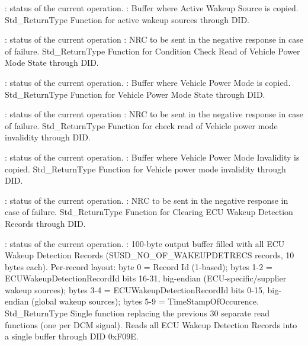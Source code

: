 {
{: status of the current operation.}
{: Buffer where Active Wakeup Source is copied.}
{}
{Std_ReturnType}
{Function for active wakeup sources through DID.}
}
{}

{
{: status of the current operation}
{: NRC to be sent in the negative response in case of failure.}
{}
{Std_ReturnType}
{Function for Condition Check Read of Vehicle Power Mode State through DID.}
}
{}

{
{: status of the current operation.}
{: Buffer where Vehicle Power Mode is copied.}
{}
{Std_ReturnType}
{Function for Vehicle Power Mode State through DID.}
}
{}

{
{: status of the current operation}
{: NRC to be sent in the negative response in case of failure.}
{}
{Std_ReturnType}
{Function for check read of Vehicle power mode invalidity through DID.}
}
{}

{
{: status of the current operation.}
{: Buffer where Vehicle Power Mode Invalidity is copied.}
{}
{Std_ReturnType}
{Function for Vehicle power mode invalidity through DID.}
}
{}

{
	{: status of the current operation.}
	{: NRC to be sent in the negative response in case of failure.}
	{}
	{Std_ReturnType}
	{Function for Clearing ECU Wakeup Detection Records through DID.}
}
{  }

{
	{: status of the current operation.}
	{: 100-byte output buffer filled with all ECU Wakeup Detection Records (SUSD\_NO\_OF\_WAKEUPDETRECS records, 10 bytes each).
Per-record layout: byte 0 = Record Id (1-based); bytes 1-2 = ECUWakeupDetectionRecordId bits 16-31, big-endian (ECU-specific/supplier wakeup sources);
bytes 3-4 = ECUWakeupDetectionRecordId bits 0-15, big-endian (global wakeup sources); bytes 5-9 = TimeStampOfOccurence.}
	{}
	{Std_ReturnType}
	{Single function replacing the previous 30 separate read functions (one per DCM signal). Reads all ECU Wakeup Detection Records into a single buffer
through DID 0xF09E.}
}
{ }

